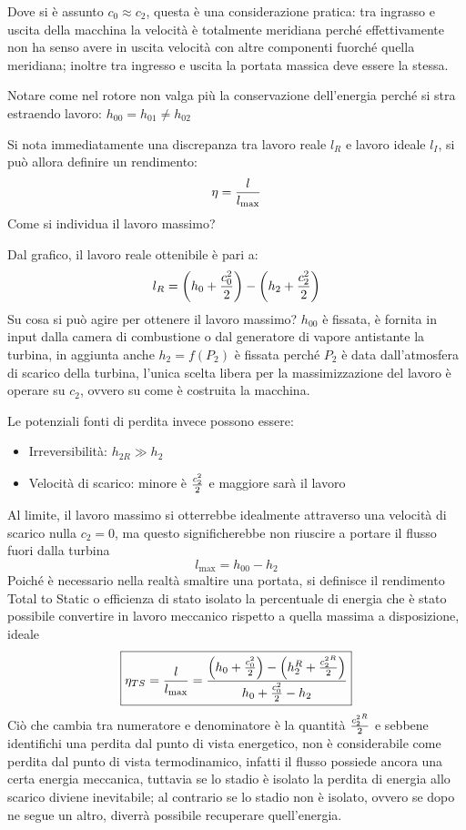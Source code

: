 \documentclass[a4paper, 15pt]{article}
\begin{document}
\begin{adjustwidth}{2in}{}
	Dove si è assunto $c_0\approx c_2$, questa è una considerazione pratica: tra ingrasso e uscita della macchina la velocità è totalmente meridiana perché effettivamente non ha senso avere in uscita velocità con altre componenti fuorché quella meridiana; inoltre tra ingresso e uscita la portata massica deve essere la stessa. 
	
	Notare come nel rotore non valga più la conservazione dell'energia perché si stra estraendo lavoro: $h_{00}=h_{01}\ne h_{02}$ \newline 
	
	Si nota immediatamente una discrepanza tra lavoro reale $l_R$ e lavoro ideale $l_I$, si può allora definire un rendimento:
	\[\eta = {l\over l_{\max}}\]
	Come si individua il lavoro massimo? \newline
	
	Dal grafico, il lavoro reale ottenibile è pari a:
	\[ l_R = \left(h_0 + {c_0^2\over2}\right) - \left(h_2+{c_2^2\over2}\right)\]
	Su cosa si può agire per ottenere il lavoro massimo? $h_{00}$ è fissata, è fornita in input dalla camera di combustione o dal generatore di vapore antistante la turbina, in aggiunta anche $h_2=f(P_2)$ è fissata perché $P_2$ è data dall'atmosfera di scarico della turbina, l'unica scelta libera per la massimizzazione del lavoro è operare su $c_2$, ovvero su come è costruita la macchina. \newline 
	
	Le potenziali fonti di perdita invece possono essere:
	\begin{itemize}
		\item Irreversibilità: \(h_{2R}\gg h_2\)
		\item Velocità di scarico: minore è $c_2^2\over2$ e maggiore sarà il lavoro
	\end{itemize}
	Al limite, il lavoro massimo si otterrebbe idealmente attraverso una velocità di scarico nulla $c_2=0$, ma questo significherebbe non riuscire a portare il flusso fuori dalla turbina
	\[l_{\max} = h_{00}-h_2\]
	Poiché è necessario nella realtà smaltire una portata, si definisce il rendimento Total to Static o efficienza di stato isolato la percentuale di energia che è stato possibile convertire in lavoro meccanico rispetto a quella massima a disposizione, ideale
	\begin{equation}{\label{eq:9}}
		\boxed{\eta_{TS}={l\over l_{\max}} = \dfrac{\left(h_0 + {c_0^2\over2}\right) - \left(h^R_2+{{c_2^2}^R\over2}\right)}{h_0 + {c_0^2\over2} - h_2}}
	\end{equation}
	Ciò che cambia tra numeratore e denominatore è la quantità ${{c_2^2}^R\over2}$ e sebbene identifichi una perdita dal punto di vista energetico, non è considerabile come perdita dal punto di vista termodinamico, infatti il flusso possiede ancora una certa energia meccanica, tuttavia se lo stadio è isolato la perdita di energia allo scarico diviene inevitabile; al contrario se lo stadio non è isolato, ovvero se dopo ne segue un altro, diverrà possibile recuperare quell'energia. \newline 
	

\end{adjustwidth}
\end{document}
